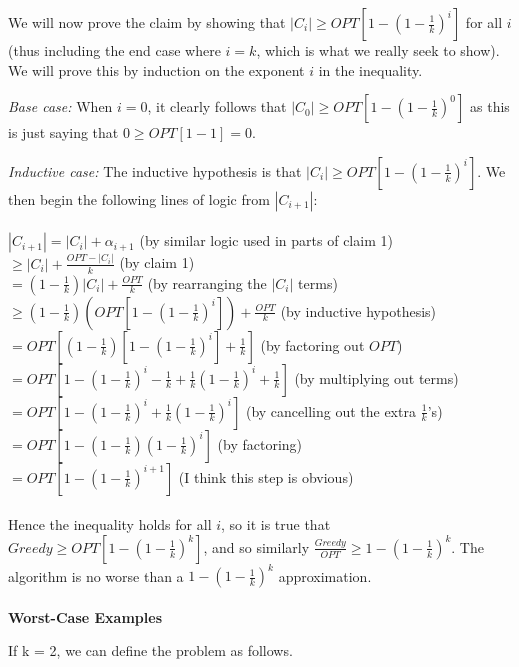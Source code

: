 \documentclass{article}
\begin{document}
We will now prove the claim by showing that $|C_i| \ge OPT[1-(1-\frac{1}{k})^i]$ for all $i$ (thus including the end case where $i=k$, which is what we really seek to show). We will prove this by induction on the exponent $i$ in the inequality.

\textit{Base case: } When $i=0$, it clearly follows that $|C_0| \ge OPT[1-(1-\frac{1}{k})^0]$ as this is just saying that $0 \ge OPT[1-1] = 0$.

\textit{Inductive case: } The inductive hypothesis is that $|C_i| \ge OPT[1-(1-\frac{1}{k})^i]$. We then begin the following lines of logic from $|C_{i+1}|$:
\\
\\
$|C_{i+1}| = |C_i| + \alpha_{i+1}$ \indent (by similar logic used in parts of claim 1)
\\
$\ge |C_i|+\frac{OPT-|C_i|}{k}$ \indent (by claim 1)
\\
$=(1-\frac{1}{k})|C_i| + \frac{OPT}{k}$ \indent (by rearranging the $|C_i|$ terms)
\\
$\ge (1-\frac{1}{k})(OPT[1-(1-\frac{1}{k})^i]) + \frac{OPT}{k}$ \indent (by inductive hypothesis)
\\
$= OPT[(1-\frac{1}{k})[1-(1-\frac{1}{k})^i] + \frac{1}{k}]$ \indent (by factoring out $OPT$)
\\
$= OPT[1 - (1-\frac{1}{k})^i-\frac{1}{k}+\frac{1}{k}(1-\frac{1}{k})^i+\frac{1}{k}]$ \indent (by multiplying out terms)
\\
$= OPT[1-(1-\frac{1}{k})^i + \frac{1}{k}(1-\frac{1}{k})^i]$ \indent (by cancelling out the extra $\frac{1}{k}$'s)
\\
$= OPT[1-(1-\frac{1}{k})(1-\frac{1}{k})^i]$ \indent (by factoring)
\\
$= OPT[1-(1-\frac{1}{k})^{i+1}]$ \indent (I think this step is obvious)
\\
\\
Hence the inequality holds for all $i$, so it is true that $Greedy \ge OPT[1-(1-\frac{1}{k})^k]$, and so similarly $\frac{Greedy}{OPT} \ge 1-(1-\frac{1}{k})^k$. The algorithm is no worse than a $1-(1-\frac{1}{k})^k$ approximation. 
\\
\\
\textbf{Worst-Case Examples}\\

\vspace{3in}

\bigskip
\noindent If k = 2, we can define the problem as follows.\\
\end{document}
